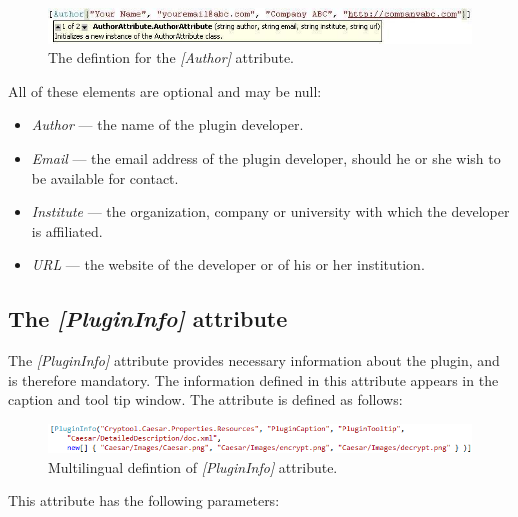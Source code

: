 \begin{figure}[h!]
	\centering
		\includegraphics[width=.90\textwidth]{figures/attribute_author.jpg}
	\caption{The defintion for the \textit{[Author]} attribute.}
	\label{fig:attribute_author}
\end{figure}

All of these elements are optional and may be null:

\begin{itemize}
	\item \textit{Author} --- the name of the plugin developer.
	\item \textit{Email} --- the email address of the plugin developer, should he or she wish to be available for contact.
	\item \textit{Institute} --- the organization, company or university with which the developer is affiliated.
	\item \textit{URL} --- the website of the developer or of his or her institution.
\end{itemize}

\subsection{The \protect\textit{[PluginInfo]} attribute}
\label{sec:ThePluginInfoAttribute}

The \textit{[PluginInfo]} attribute provides necessary information about the plugin, and is therefore mandatory. The information defined in this attribute appears in the caption and tool tip window. The attribute is defined as follows:

\begin{figure}[h]
	\centering
		\includegraphics[width=1.00\textwidth]{figures/attribute_plugininfo.png}
	\caption{Multilingual defintion of \textit{[PluginInfo]} attribute.}
	\label{fig:attribute_plugininfo}
\end{figure}

\noindent This attribute has the following parameters:

